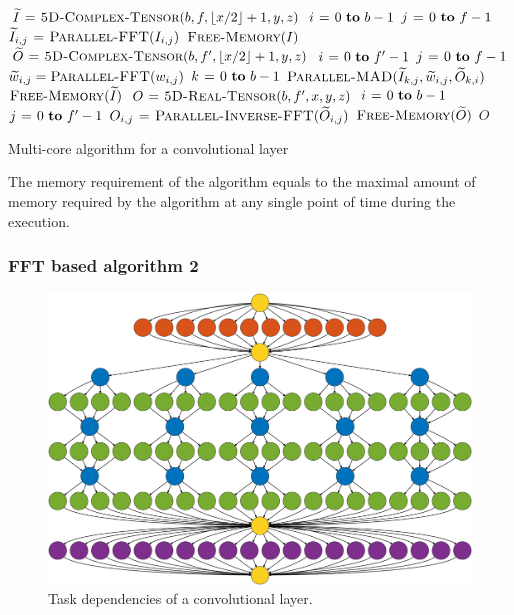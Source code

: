 \documentclass[conference]{IEEEtran}
\DeclarePairedDelimiter{\floor}{\lfloor}{\rfloor}
\begin{document}
\begin{algorithm}
  {\small
  \begin{codebox}
    \li $\widetilde{I} \gets \proc{5D-Complex-Tensor}(b,f,\floor{x/2}+1,y,z)$
    \li \For $i \gets 0 \To b-1$
    \li   \Do \For $j \gets 0 \To f-1$
    \li     \Do $\widetilde{I}_{i,j} \mathrel{\hspace{1pt}=\hspace{1pt}} \textnormal{\scshape Parallel-FFT}(I_{i,j})$
    \End \End
    \li $\textnormal{\scshape Free-Memory}(I)$
    \li $\widetilde{O} \gets \proc{5D-Complex-Tensor}(b,f',\floor{x/2}+1,y,z)$
    \li \For $i \gets 0 \To f'-1$
    \li   \Do \For $j \gets 0 \To f-1$
    \li     \Do $\widetilde{w}_{i,j} = \textnormal{\scshape Parallel-FFT}(w_{i,j})$
    \li         \For $k \gets 0 \To b-1$
    \li           \Do $\textnormal{\scshape Parallel-MAD}(\widetilde{I}_{k,j}, \widetilde{w}_{i,j}, \widetilde{O}_{k,i})$
    \End \End \End
    \li $\textnormal{\scshape Free-Memory}(\widetilde{I})$
    \li $O \mathrel{\hspace{1pt}=\hspace{1pt}} \textnormal{\scshape5D-Real-Tensor}(b,f',x,y,z)$
    \li \For $i \gets 0 \To b-1$
    \li   \Do \For $j \gets 0 \To f'-1$
    \li     \Do $O_{i,j} \mathrel{\hspace{1pt}=\hspace{1pt}} \textnormal{\scshape Parallel-Inverse-FFT}(\widetilde{O}_{i,j})$
    \End \End
    \li $\textnormal{\scshape Free-Memory}(\widetilde{O})$
    \li \Return $O$
  \end{codebox}
  }

  \caption{Multi-core algorithm for a convolutional
  layer}
  \label{alg:cpu_alg1}
\end{algorithm}

The memory requirement of the algorithm equals to the maximal amount
of memory required by the algorithm at any single point of time during
the execution.

\subsubsection{FFT based algorithm 2}

\begin{figure}
  \begin{center}
  \includegraphics[width=0.95\columnwidth]{fig/deps}
  \end{center}
  \caption{Task dependencies of a convolutional layer.}
  \label{fig:task_deps}
\end{figure}
\end{document}
